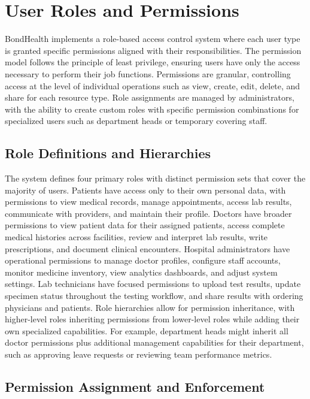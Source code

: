 \section{User Roles and Permissions}

\justifying
\noindent BondHealth implements a role-based access control system where each user type is granted specific permissions aligned with their responsibilities. The permission model follows the principle of least privilege, ensuring users have only the access necessary to perform their job functions. Permissions are granular, controlling access at the level of individual operations such as view, create, edit, delete, and share for each resource type. Role assignments are managed by administrators, with the ability to create custom roles with specific permission combinations for specialized users such as department heads or temporary covering staff.

\subsection{Role Definitions and Hierarchies}

\justifying
\noindent The system defines four primary roles with distinct permission sets that cover the majority of users. Patients have access only to their own personal data, with permissions to view medical records, manage appointments, access lab results, communicate with providers, and maintain their profile. Doctors have broader permissions to view patient data for their assigned patients, access complete medical histories across facilities, review and interpret lab results, write prescriptions, and document clinical encounters. Hospital administrators have operational permissions to manage doctor profiles, configure staff accounts, monitor medicine inventory, view analytics dashboards, and adjust system settings. Lab technicians have focused permissions to upload test results, update specimen status throughout the testing workflow, and share results with ordering physicians and patients. Role hierarchies allow for permission inheritance, with higher-level roles inheriting permissions from lower-level roles while adding their own specialized capabilities. For example, department heads might inherit all doctor permissions plus additional management capabilities for their department, such as approving leave requests or reviewing team performance metrics.

\subsection{Permission Assignment and Enforcement}

